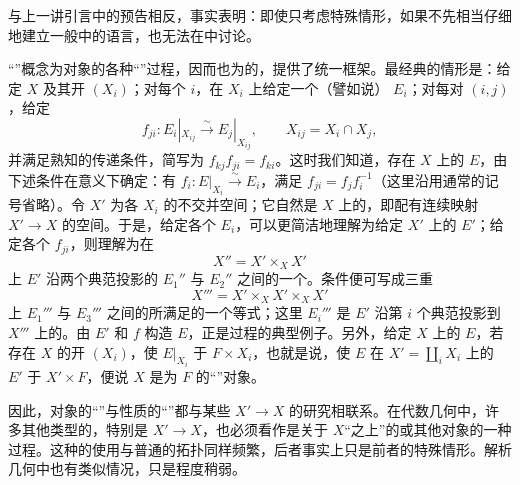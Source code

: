 与上一讲引言中的预告相反，事实表明：即使只考虑特殊情形，如果不先相当仔细地建立一般中的语言，也无法在中讨论。

“”概念为对象的各种“”过程，因而也为的，提供了统一框架。最经典的情形是：给定 $X$ 及其开 $(X_i)$；对每个 $i$，在 $X_i$ 上给定一个（譬如说） $E_i$；对每对 $(i,j)$，给定
\[
 f_{ji}:E_i|_{X_{ij}}\xrightarrow{\sim}E_j|_{X_{ij}},\qquad X_{ij}=X_i\cap X_j,
\]
并满足熟知的传递条件，简写为 $f_{kj}f_{ji}=f_{ki}$。这时我们知道，存在 $X$ 上的 $E$，由下述条件在意义下确定：有 $f_i:E|_{X_i}\xrightarrow{\sim}E_i$，满足 $f_{ji}=f_jf_i^{-1}$（这里沿用通常的记号省略）。令 $X'$ 为各 $X_i$ 的不交并空间；它自然是 $X$ 上的，即配有连续映射 $X'\to X$ 的空间。于是，给定各个 $E_i$，可以更简洁地理解为给定 $X'$ 上的 $E'$；给定各个 $f_{ji}$，则理解为在
\[
 X''=X'\times_X X'
\]
上 $E'$ 沿两个典范投影的 $E_1''$ 与 $E_2''$ 之间的一个。条件便可写成三重
\[
 X'''=X'\times_X X'\times_X X'
\]
上 $E_1'''$ 与 $E_3'''$ 之间的所满足的一个等式；这里 $E_i'''$ 是 $E'$ 沿第 $i$ 个典范投影到 $X'''$ 上的。由 $E'$ 和 $f$ 构造 $E$，正是过程的典型例子。另外，给定 $X$ 上的 $E$，若存在 $X$ 的开 $(X_i)$，使 $E|_{X_i}$ 于 $F\times X_i$，也就是说，使 $E$ 在 $X'=\coprod_iX_i$ 上的 $E'$ 于 $X'\times F$，便说 $X$ 是为 $F$ 的“”对象。

因此，对象的“”与性质的“”都与某些 $X'\to X$ 的研究相联系。在代数几何中，许多其他类型的，特别是 $X'\to X$，也必须看作是关于 $X$“之上”的或其他对象的一种过程。这种的使用与普通的拓扑同样频繁，后者事实上只是前者的特殊情形。解析几何中也有类似情况，只是程度稍弱。

